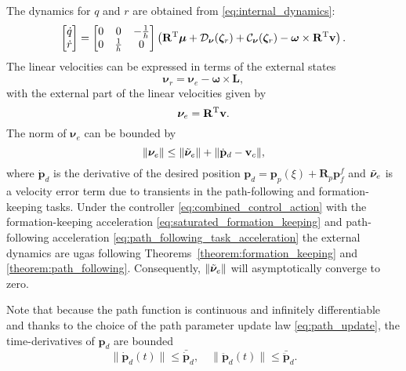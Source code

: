 The  dynamics for $q$ and $r$ are obtained from \eqref{eq:internal_dynamics}:
\begin{equation}
    \begin{bmatrix}
    \dot{q}\\ \dot{r}
    \end{bmatrix}
    = \begin{bmatrix}
        0 & 0 & -\tfrac{1}{h}\\ 0 & \tfrac{1}{h} & 0
    \end{bmatrix}\left (\mathbf{R}^{\rm T}\bm{\mu} + \mathcal{D}_{\bm{\nu}} (\bm{\zeta}_r) + \mathcal{C}_{\bm{\nu}} (\bm{\zeta}_r) - \bm{\omega} \times \mathbf{R}^{\rm T} \mathbf{v}\right ).
\end{equation}
The linear velocities can be expressed in terms of the external states
\begin{equation}
    \bm{\nu}_r = \bm{\nu}_e - \bm{\omega} \times \mathbf{L},
\end{equation}
with the external part of the linear velocities given by
\begin{equation}
    \bm{\nu}_e = \mathbf{R}^{\rm T} \mathbf{v}.
\end{equation}
The norm of $\bm{\nu}_e$ can be bounded by
\begin{equation}\label{eq:nu_norm_bound}
    \| \bm{\nu}_e \| \leq \| \Tilde{\bm{\nu}}_e \| + \| \dot{\mathbf{p}}_d - \mathbf{v}_c \|,
\end{equation}
where $\dot{\mathbf{p}}_d$ is the derivative of the desired position $\mathbf{p}_d = \mathbf{p}_p(\xi) + \mathbf{R}_p \mathbf{p}_f^f$ and $\Tilde{\bm{\nu}}_e$ is a velocity error term due to transients in the path-following and formation-keeping tasks. Under the controller \eqref{eq:combined_control_action} with the formation-keeping acceleration \eqref{eq:saturated_formation_keeping} and path-following acceleration \eqref{eq:path_following_task_acceleration} the external dynamics are \gls{ugas} following Theorems~\ref{theorem:formation_keeping} and \ref{theorem:path_following}. Consequently, $\| \Tilde{\bm{\nu}}_e \|$ will asymptotically converge to zero.

Note that because the path function is continuous and infinitely differentiable and thanks to the choice of the path parameter update law \eqref{eq:path_update}, the time-derivatives of $\mathbf{p}_{{d}}$ are bounded
\begin{equation}\label{eq:desired_velocity_bound}
    \|\dot{\mathbf{p}}_{d}(t)\| \leq \bar{\dot{\mathbf{p}}}_{d}, \quad \|\ddot{\mathbf{p}}_{d}(t)\| \leq \bar{\ddot{\mathbf{p}}}_{d}.
\end{equation}

